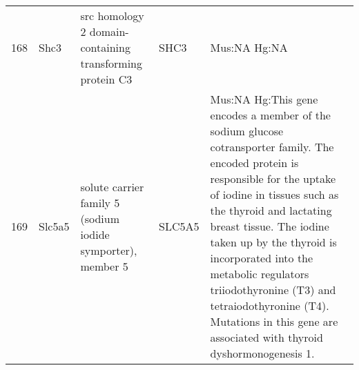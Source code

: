 \documentclass[11pt, landscape]{article}   	%
\begin{document}
\begin{table}[ht]
\begin{tabular}{rlp{3cm}lp{12cm}}
  168 & Shc3 & src homology 2 domain-containing transforming protein C3 & SHC3 & Mus:NA Hg:NA \\ 
  169 & Slc5a5 & solute carrier family 5 (sodium iodide symporter), member 5 & SLC5A5 & Mus:NA Hg:This gene encodes a member of the sodium glucose cotransporter family. The encoded protein is responsible for the uptake of iodine in tissues such as the thyroid and lactating breast tissue. The iodine taken up by the thyroid is incorporated into the metabolic regulators triiodothyronine (T3) and tetraiodothyronine (T4). Mutations in this gene are associated with thyroid dyshormonogenesis 1. \\ 

   \hline
\end{tabular}
\end{table}
\end{document}
